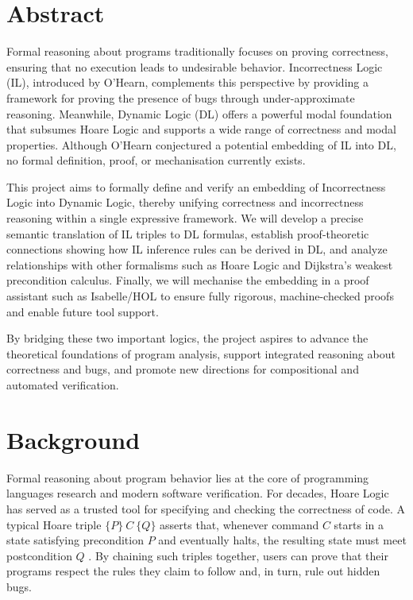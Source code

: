 \section*{Abstract}

Formal reasoning about programs traditionally focuses on proving correctness, ensuring that no execution leads to undesirable behavior. Incorrectness Logic (IL), introduced by O’Hearn, complements this perspective by providing a framework for proving the presence of bugs through under-approximate reasoning. Meanwhile, Dynamic Logic (DL) offers a powerful modal foundation that subsumes Hoare Logic and supports a wide range of correctness and modal properties. Although O’Hearn conjectured a potential embedding of IL into DL, no formal definition, proof, or mechanisation currently exists.

This project aims to formally define and verify an embedding of Incorrectness Logic into Dynamic Logic, thereby unifying correctness and incorrectness reasoning within a single expressive framework. We will develop a precise semantic translation of IL triples to DL formulas, establish proof-theoretic connections showing how IL inference rules can be derived in DL, and analyze relationships with other formalisms such as Hoare Logic and Dijkstra's weakest precondition calculus. Finally, we will mechanise the embedding in a proof assistant such as Isabelle/HOL to ensure fully rigorous, machine-checked proofs and enable future tool support.

By bridging these two important logics, the project aspires to advance the theoretical foundations of program analysis, support integrated reasoning about correctness and bugs, and promote new directions for compositional and automated verification.

\section*{Background}

Formal reasoning about program behavior lies at the core of programming languages research and modern software verification. For decades, Hoare Logic has served as a trusted tool for specifying and checking the correctness of code. A typical Hoare triple $\{P\}~C~\{Q\}$ asserts that, whenever command $C$ starts in a state satisfying precondition $P$ and eventually halts, the resulting state must meet postcondition $Q$ \cite{hoare1969axiomatic}. By chaining such triples together, users can prove that their programs respect the rules they claim to follow and, in turn, rule out hidden bugs.

